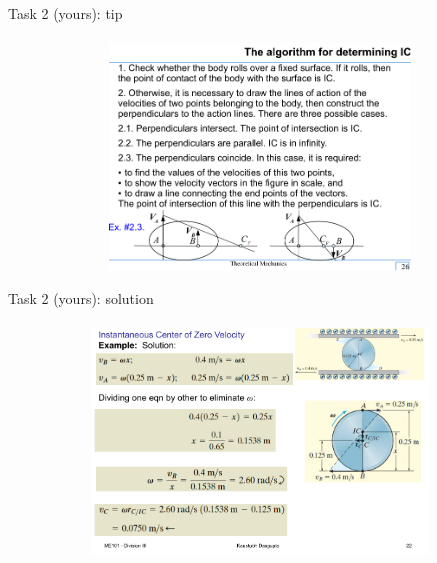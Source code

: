 \documentclass[aspectratio=169]{beamer}
\begin{document}
\begin{frame}[t]{Task 2 (yours): tip}
\framesubtitle{}
    \vspace{-0.6cm}
    \begin{figure}[H]
        \centering\includegraphics[height=6cm,width=1\textwidth,keepaspectratio]{image22.png}
        \label{fig:image22}
    \end{figure}
\end{frame}

\begin{frame}[t]{Task 2 (yours): solution}
\framesubtitle{}
    \vspace{-0.6cm}
    \begin{figure}[H]
        \centering\includegraphics[height=6cm,width=1\textwidth,keepaspectratio]{image25.png}
        \label{fig:image25}
    \end{figure}
\end{frame}
\end{document}
